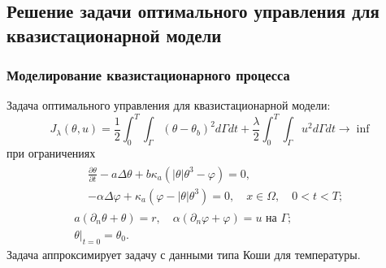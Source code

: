 \subsection{Решение задачи оптимального управления для квазистационарной модели}\label{quasi-solve}
\begin{frame}
    \frametitle{Моделирование квазистационарного процесса}
    Задача оптимального управления для квазистационарной модели:
    \begin{equation*}
        J_{\lambda}(\theta, u)=\frac{1}{2} \int_{0}^{T}
        \int_{\Gamma}\left(\theta-\theta_{b}\right)^{2} d \Gamma d t+\frac{\lambda}{2}
        \int_{0}^{T} \int_{\Gamma} u^{2} d \Gamma d t \rightarrow \inf
    \end{equation*}
    при ограничениях
    \begin{gather*}
        \begin{split}
            & \frac{\partial \theta}{\partial t} - a \Delta \theta
            + b \kappa_{a} \left(|\theta| \theta^{3}-\varphi\right) = 0,\\
            & - \alpha \Delta \varphi
            + \kappa_{a} \left(\varphi-|\theta| \theta^{3}\right) = 0,
            \quad x \in \Omega, \quad 0 < t < T;
        \end{split}\\
        a \left(\partial_{n} \theta+\theta\right)=r,
        \quad \alpha\left(\partial_{n} \varphi
        + \varphi\right) = u \text { на } \Gamma;\\
        \left.\theta\right|_{t=0} = \theta_{0}.
    \end{gather*}
    Задача аппроксимирует задачу с данными типа Коши для температуры.
\end{frame}

